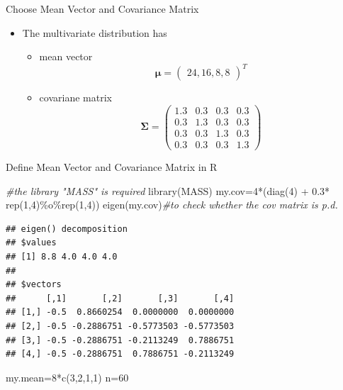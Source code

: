\documentclass[
  ignorenonframetext,
]{beamer}
\newenvironment{Shaded}{\begin{snugshade}}{\end{snugshade}}
\newcommand{\CommentTok}[1]{\textcolor[rgb]{0.56,0.35,0.01}{\textit{#1}}}
\newcommand{\DecValTok}[1]{\textcolor[rgb]{0.00,0.00,0.81}{#1}}
\newcommand{\FloatTok}[1]{\textcolor[rgb]{0.00,0.00,0.81}{#1}}
\newcommand{\FunctionTok}[1]{\textcolor[rgb]{0.00,0.00,0.00}{#1}}
\newcommand{\NormalTok}[1]{#1}
\newcommand{\OtherTok}[1]{\textcolor[rgb]{0.56,0.35,0.01}{#1}}
\newcommand{\SpecialCharTok}[1]{\textcolor[rgb]{0.00,0.00,0.00}{#1}}
\providecommand{\tightlist}{%
  \setlength{\itemsep}{0pt}\setlength{\parskip}{0pt}}
\begin{document}
\begin{frame}{Choose Mean Vector and Covariance Matrix}
\protect\hypertarget{choose-mean-vector-and-covariance-matrix}{}
\begin{itemize}
\tightlist
\item
  The multivariate distribution has

  \begin{itemize}
  \tightlist
  \item
    mean vector
    \[\boldsymbol \mu=\begin{pmatrix}24, 16, 8, 8\end{pmatrix}^T\]
  \item
    covariane matrix \[\boldsymbol \Sigma= \begin{pmatrix}
    1.3 & 0.3 & 0.3 & 0.3\\
    0.3 & 1.3 & 0.3 & 0.3\\
    0.3 & 0.3 & 1.3 & 0.3\\
    0.3 & 0.3 & 0.3 & 1.3
    \end{pmatrix}\]
  \end{itemize}
\end{itemize}
\end{frame}

\begin{frame}[fragile]{Define Mean Vector and Covariance Matrix in R}
\protect\hypertarget{define-mean-vector-and-covariance-matrix-in-r}{}
\begin{Shaded}
\begin{Highlighting}[]
\CommentTok{\#the library "MASS" is required}
\FunctionTok{library}\NormalTok{(MASS)}
\NormalTok{my.cov}\OtherTok{=}\DecValTok{4}\SpecialCharTok{*}\NormalTok{(}\FunctionTok{diag}\NormalTok{(}\DecValTok{4}\NormalTok{) }\SpecialCharTok{+} \FloatTok{0.3}\SpecialCharTok{*} \FunctionTok{rep}\NormalTok{(}\DecValTok{1}\NormalTok{,}\DecValTok{4}\NormalTok{)}\SpecialCharTok{\%o\%}\FunctionTok{rep}\NormalTok{(}\DecValTok{1}\NormalTok{,}\DecValTok{4}\NormalTok{))}
\FunctionTok{eigen}\NormalTok{(my.cov)}\CommentTok{\#to check whether the cov matrix is p.d.}
\end{Highlighting}
\end{Shaded}

\begin{verbatim}
## eigen() decomposition
## $values
## [1] 8.8 4.0 4.0 4.0
## 
## $vectors
##      [,1]       [,2]       [,3]       [,4]
## [1,] -0.5  0.8660254  0.0000000  0.0000000
## [2,] -0.5 -0.2886751 -0.5773503 -0.5773503
## [3,] -0.5 -0.2886751 -0.2113249  0.7886751
## [4,] -0.5 -0.2886751  0.7886751 -0.2113249
\end{verbatim}

\begin{Shaded}
\begin{Highlighting}[]
\NormalTok{my.mean}\OtherTok{=}\DecValTok{8}\SpecialCharTok{*}\FunctionTok{c}\NormalTok{(}\DecValTok{3}\NormalTok{,}\DecValTok{2}\NormalTok{,}\DecValTok{1}\NormalTok{,}\DecValTok{1}\NormalTok{)}
\NormalTok{n}\OtherTok{=}\DecValTok{60}
\end{Highlighting}
\end{Shaded}
\end{frame}
\end{document}
